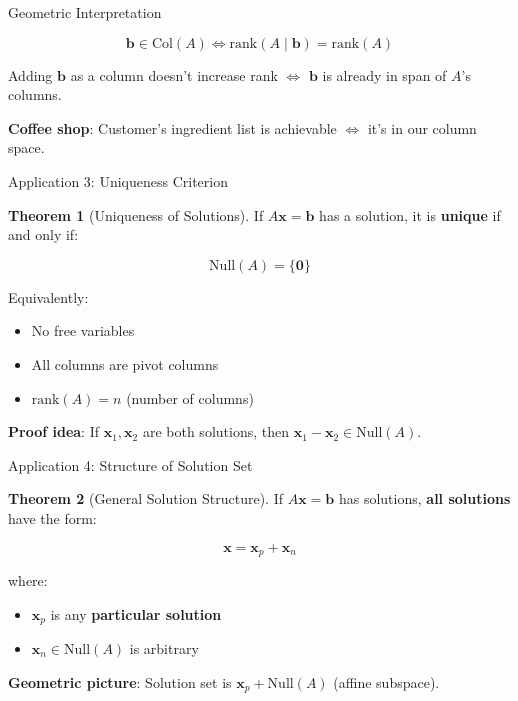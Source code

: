 \documentclass[10pt]{beamer}
\theoremstyle{definition}
\newtheorem{thm}{Theorem}[section]
\newcommand{\x}[1]{\alert{\textbf{#1}}}
\begin{document}
\begin{frame}{Geometric Interpretation}

$$\mathbf{b} \in \text{Col}(A) \iff \text{rank}(A \mid \mathbf{b}) = \text{rank}(A)$$

\vspace{1em}

Adding $\mathbf{b}$ as a column doesn't increase rank $\iff$ $\mathbf{b}$ is already in span of $A$'s columns.

\vspace{1em}

\x{Coffee shop}: Customer's ingredient list is achievable $\iff$ it's in our column space.

\end{frame}

\begin{frame}{Application 3: Uniqueness Criterion}

\begin{thm}[Uniqueness of Solutions]
If $A\mathbf{x} = \mathbf{b}$ has a solution, it is \textbf{unique} if and only if:

$$\text{Null}(A) = \{\mathbf{0}\}$$

Equivalently:
\begin{itemize}
\item No free variables
\item All columns are pivot columns
\item $\text{rank}(A) = n$ (number of columns)
\end{itemize}
\end{thm}

\vspace{0.5em}

\x{Proof idea}: If $\mathbf{x}_1, \mathbf{x}_2$ are both solutions, then $\mathbf{x}_1 - \mathbf{x}_2 \in \text{Null}(A)$.

\end{frame}

\begin{frame}{Application 4: Structure of Solution Set}

\begin{thm}[General Solution Structure]
If $A\mathbf{x} = \mathbf{b}$ has solutions, \textbf{all solutions} have the form:

$$\mathbf{x} = \mathbf{x}_p + \mathbf{x}_n$$

where:
\begin{itemize}
\item $\mathbf{x}_p$ is any \textbf{particular solution}
\item $\mathbf{x}_n \in \text{Null}(A)$ is arbitrary
\end{itemize}
\end{thm}

\vspace{0.5em}

\x{Geometric picture}: Solution set is $\mathbf{x}_p + \text{Null}(A)$ (affine subspace).

\end{frame}
\end{document}
